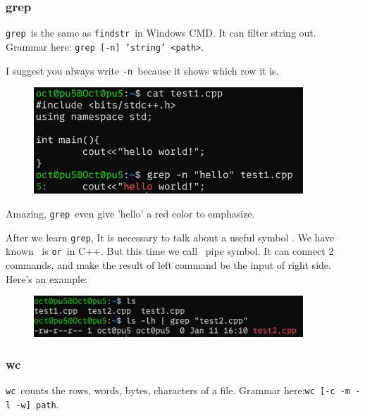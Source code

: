 \documentclass[12pt]{ctexart}
\newenvironment{mdquote}
{%
  \par\noindent
  \begin{list}{}{%
      \setlength{\leftmargin}{1em}%
      \setlength{\rightmargin}{0pt}%
      \setlength{\itemindent}{0pt}%
      \setlength{\listparindent}{\parindent}%
      \setlength{\topsep}{0.5\baselineskip}%
  }
  \item[\textbf{>}\ ]\itshape
}
{\end{list}\par}
\begin{document}
\subsubsection{\textbf{grep}}

\texttt{grep}\ is the same as \texttt{findstr}\ in Windows CMD. It can
filter string out. Grammar here:
\texttt{grep\ {[}-n{]}\ 'string'\ \textless{}path\textgreater{}}.

\begin{mdquote}
I suggest you always write \texttt{-n}\ because it shows which row it is.
\end{mdquote}

\begin{figure}[H]
    \centering
    \includegraphics[width=0.9\textwidth,keepaspectratio]{assets/Linux/1.5 Linux file commands/10.png}
\end{figure}

Amazing, \texttt{grep}\ even give 'hello' a red color to emphasize.

After we learn \texttt{grep}, It is necessary to talk about a useful
symbol \texttt{\textbar{}}. We have known \texttt{\textbar{}\textbar{}}\
is \texttt{or}\ in C++. But this time we call \texttt{\textbar{}}\ pipe
symbol. It can connect 2 commands, and make the result of left command
be the input of right side. Here's an example:

\begin{figure}[H]
    \centering
    \includegraphics[width=0.9\textwidth,keepaspectratio]{assets/Linux/1.5 Linux file commands/11.png}
\end{figure}
\subsubsection{\textbf{wc}}

\texttt{wc}\ counts the rows, words, bytes, characters of a file. Grammar
here:\texttt{wc\ {[}-c\ -m\ -l\ -w{]}\ path}.
\end{document}
